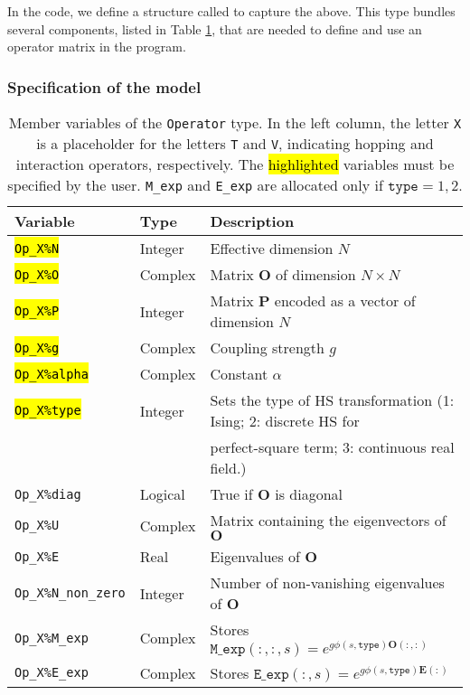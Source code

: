 In the code, we define a structure called  to capture the above. 
This type  bundles several components, listed in Table \ref{table:operator}, that are needed to define and use an operator matrix in the program.  

\subsubsection{Specification of the model}\label{sec:specific}
%
\begin{table}[h]
    \begin{tabular}{@{} l l l @{}}\toprule
    Variable & Type & Description \\\midrule
    \hl{\texttt{Op\_X\%N}}       & Integer     &  Effective dimension $N$ \\
    \hl{\texttt{Op\_X\%O}}       & Complex    &  Matrix  $\bm{O}$  of dimension $N \times N$\\
    \hl{\texttt{Op\_X\%P}}       & Integer   &  Matrix $\bm{P}$  encoded as a vector of dimension $N$\\
    \hl{\texttt{Op\_X\%g}}       & Complex    &  Coupling strength $g$ \\  
    \hl{\texttt{Op\_X\%alpha}}   & Complex  &  Constant $\alpha$ \\
    \hl{\texttt{Op\_X\%type}}    & Integer   &  Sets the type of HS transformation (1: Ising; 2: discrete HS for\\
             &   &   perfect-square term; 3: continuous real field.)  \\ 
    \texttt{Op\_X\%diag}  & Logical & True if   $\bm{O}$  is  diagonal  \\
    \texttt{Op\_X\%U}            & Complex &  Matrix containing the eigenvectors of $\bm{O}$  \\
    \texttt{Op\_X\%E}            & Real &  Eigenvalues of $\bm{O}$ \\
    \texttt{Op\_X\%N\_non\_zero} & Integer &  Number of non-vanishing eigenvalues of $\bm{O}$  \\
    \texttt{Op\_X\%M\_exp}    & Complex &  Stores $ \texttt{M\_exp}(:,:,s) = e^{g  \phi(s,\texttt{type}) \bm{O}(:,:)} $  \\
    \texttt{Op\_X\%E\_exp}    & Complex &  Stores $ \texttt{E\_exp}(:,s) = e^{g  \phi(s,\texttt{type}) \bm{E}(:)} $ 
     \\\bottomrule
   \end{tabular}
   \caption{Member variables of the \texttt{Operator}  type. 
   In the left column, the letter \texttt{X} is a placeholder for the letters \texttt{T} and \texttt{V}, 
   indicating hopping and interaction operators, respectively.
   The \hl{highlighted} variables must be specified by the user. \texttt{M\_exp} and \texttt{E\_exp}  are allocated only if  $\texttt{type}=1,2$. 
    \label{table:operator}}
\end{table}
